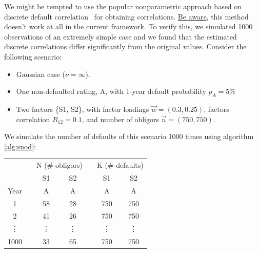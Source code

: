 \documentclass[11pt,fleqn]{book} %
\begin{document}
We might be tempted to use the popular nonparametric approach based on discrete 
default correlation~\cite{lucas:1995,nagpal:2001} for obtaining correlations.
\underline{Be aware}, this method doesn't work at all in the current framework. 
To verify this, we simulated 1000 observations of an extremely simple case and we 
found that the estimated discrete correlations differ significantly from the 
original values. Consider the following scenario:
\begin{itemize}
	\item Gaussian case ($\nu = \infty$).
	\item One non-defaulted rating, A, with 1-year default probability $p_A=5\%$
	\item Two factors \{S1, S2\}, with factor loadings $\vec{w} = (0.3, 0.25)$, 
	factors correlation $R_{12} = 0.1$, and number of obligors $\vec{n} = (750, 750)$.
\end{itemize}
We simulate the number of defaults of this scenario 1000 times using algorithm 
\ref{alg:snod}:

\hspace*{1cm}
\begin{tabular}{cc|c||c|  c  |c||c|}
	\cline{3-4} \cline{6-7}
	& & \multicolumn{2}{|c|}{N (\# obligors)} & & \multicolumn{2}{|c|}{K (\# defaults)} \\
	\cline{3-4} \cline{6-7}
	& & \multicolumn{1}{|c||}{S1} & \multicolumn{1}{|c|}{S2} & & \multicolumn{1}{|c||}{S1} & \multicolumn{1}{|c|}{S2} \\
	\cline{1-1} \cline{3-4} \cline{6-7}
	\multicolumn{1}{|c|}{Year} & & A & A & & A & A \\
	\cline{1-1} \cline{3-4} \cline{6-7}
	\multicolumn{1}{|c|}{1} & & 58 & 28 & & 750 & 750 \\
	\cline{1-1} \cline{3-4} \cline{6-7}
	\multicolumn{1}{|c|}{2} & & 41 & 26 & & 750 & 750 \\
	\cline{1-1} \cline{3-4} \cline{6-7}
	\multicolumn{1}{|c|}{\vdots} & & \vdots & \vdots & & \vdots & \vdots \\
	\cline{1-1} \cline{3-4} \cline{6-7}
	\multicolumn{1}{|c|}{1000} & & 33 & 65 & & 750 & 750 \\
	\cline{1-1} \cline{3-4} \cline{6-7}
\end{tabular}
\end{document}
